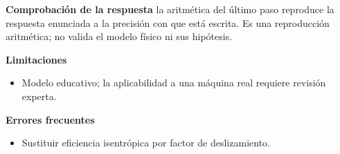\documentclass[10pt,openany]{book}
\begin{document}
\begin{tcolorbox}[title={Problema resuelto 1}, studiumworked, breakable]
\noindent\textbf{Comprobación de la respuesta} la aritmética del último paso reproduce la respuesta enunciada a la precisión con que está escrita. Es una reproducción aritmética; no valida el modelo físico ni sus hipótesis.

\noindent\textbf{Limitaciones}
\begin{itemize}
\item Modelo educativo; la aplicabilidad a una máquina real requiere revisión experta.
\end{itemize}

\noindent\textbf{Errores frecuentes}
\begin{itemize}
\item Sustituir eficiencia isentrópica por factor de deslizamiento.
\end{itemize}
\end{tcolorbox}
\end{document}
